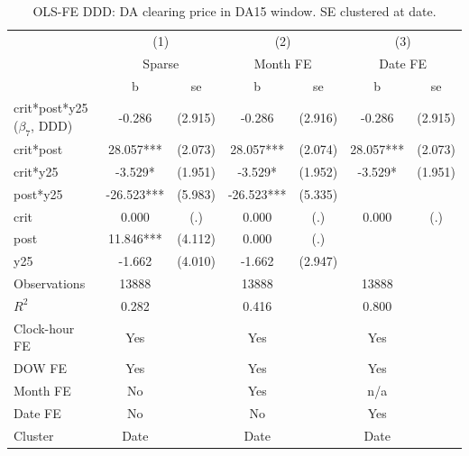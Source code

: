 \begin{table}[htbp]\centering
\def\sym#1{\ifmmode^{#1}\else\(^{#1}\)\fi}
\caption{OLS-FE DDD: DA clearing price in DA15 window. SE clustered at date.}\label{tab:reform_ddd_da15_da}
\begin{tabular}{l*{3}{cc}}
\toprule
                    &\multicolumn{2}{c}{(1)}     &\multicolumn{2}{c}{(2)}     &\multicolumn{2}{c}{(3)}     \\
                    &\multicolumn{2}{c}{Sparse}  &\multicolumn{2}{c}{Month FE}&\multicolumn{2}{c}{Date FE} \\
                    &           b   &          se&           b   &          se&           b   &          se\\
\midrule
crit*post*y25 ($\beta_7$, DDD)&      -0.286   &     (2.915)&      -0.286   &     (2.916)&      -0.286   &     (2.915)\\
crit*post           &      28.057***&     (2.073)&      28.057***&     (2.074)&      28.057***&     (2.073)\\
crit*y25            &      -3.529*  &     (1.951)&      -3.529*  &     (1.952)&      -3.529*  &     (1.951)\\
post*y25            &     -26.523***&     (5.983)&     -26.523***&     (5.335)&               &            \\
crit                &       0.000   &         (.)&       0.000   &         (.)&       0.000   &         (.)\\
post                &      11.846***&     (4.112)&       0.000   &         (.)&               &            \\
y25                 &      -1.662   &     (4.010)&      -1.662   &     (2.947)&               &            \\
\midrule
Observations        &       13888   &            &       13888   &            &       13888   &            \\
$R^2$               &       0.282   &            &       0.416   &            &       0.800   &            \\
Clock-hour FE       &         Yes   &            &         Yes   &            &         Yes   &            \\
DOW FE              &         Yes   &            &         Yes   &            &         Yes   &            \\
Month FE            &          No   &            &         Yes   &            &         n/a   &            \\
Date FE             &          No   &            &          No   &            &         Yes   &            \\
Cluster             &        Date   &            &        Date   &            &        Date   &            \\
\bottomrule
\end{tabular}
\end{table}
